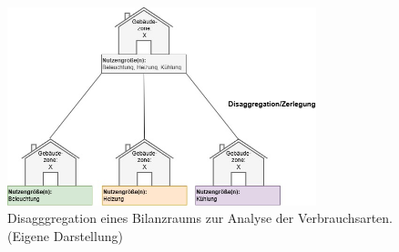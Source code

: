 \begin{figure}[H]
    \centering
    \includegraphics[width=0.8\textwidth]{../../Ressourcen/Abbildungen/Nutzengröße_Bewertungseinheit_Zerlegt.jpg}
    \caption{Disagggregation eines Bilanzraums zur Analyse der Verbrauchsarten. (Eigene Darstellung)}
    \label{fig:Disagggregation_Bilanzraum_Verbrauchsarten}
\end{figure}